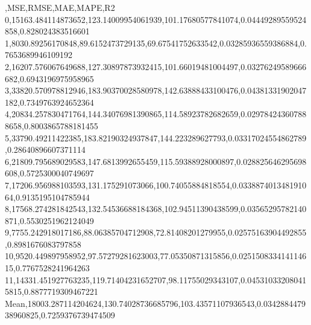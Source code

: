 ,MSE,RMSE,MAE,MAPE,R2
0,15163.484114873652,123.14009954061939,101.17680577841074,0.04449289559524858,0.828024383516601
1,8030.89256170848,89.6152473729135,69.67541752633542,0.03285936559386884,0.7653689946109192
2,16207.576067649688,127.30897873932415,101.66019481004497,0.03276249589666682,0.6943196975958965
3,33820.570978812946,183.90370028580978,142.63888433100476,0.04381331902047182,0.7349763924652364
4,20834.257830471764,144.34076981390865,114.58923782682659,0.029784243607888658,0.8003865788181455
5,33790.49211422385,183.82190324937847,144.223289627793,0.03317024554862789,0.28640896607371114
6,21809.795689029583,147.6813992655459,115.59388928000897,0.028825646295698608,0.5725300040749697
7,17206.956988103593,131.175291073066,100.74055884818554,0.033887401348191064,0.9135195104785944
8,17568.274281842543,132.54536688184368,102.94511390438599,0.03565295782140871,0.5530251962124049
9,7755.242918017186,88.06385704712908,72.81408201279955,0.02575163904492855,0.8981676083797858
10,9520.449897958952,97.57279281623003,77.05350871315856,0.025150833414114615,0.7767528241964263
11,14331.451927763235,119.71404231652707,98.11755029343107,0.045310332080415815,0.8877719309467221
Mean,18003.287114204624,130.74028736685796,103.43571107936543,0.034288447938960825,0.7259376739474509
